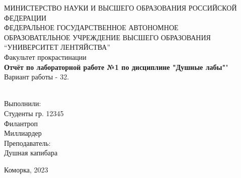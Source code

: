 \begin{center}
	МИНИСТЕРСТВО НАУКИ И ВЫСШЕГО ОБРАЗОВАНИЯ РОССИЙСКОЙ ФЕДЕРАЦИИ\\
	\hfill \break
	ФЕДЕРАЛЬНОЕ ГОСУДАРСТВЕННОЕ АВТОНОМНОЕ \\ ОБРАЗОВАТЕЛЬНОЕ УЧРЕЖДЕНИЕ ВЫСШЕГО ОБРАЗОВАНИЯ \\
	“УНИВЕРСИТЕТ ЛЕНТЯЙСТВА” \\
	
	\hfill \break
	Факультет прокрастинации\\
	\vspace{2.5cm}
	\large{\textbf{Отчёт по лабораторной работе №1 по дисциплине "Душные лабы"}}"\\
	Вариант работы - 32.\\
	\hfill \break
	\\
\end{center}

\vspace{5cm}

\begin{flushright}
	Выполнили:\\
	Студенты гр. 12345\\
	Филантроп\\
	Миллиардер \\
	Преподаватель:\\
	Душная капибара\\
\end{flushright}

\vfill


\begin{center} Коморка, 2023 \end{center}

\thispagestyle{empty}
\newpage